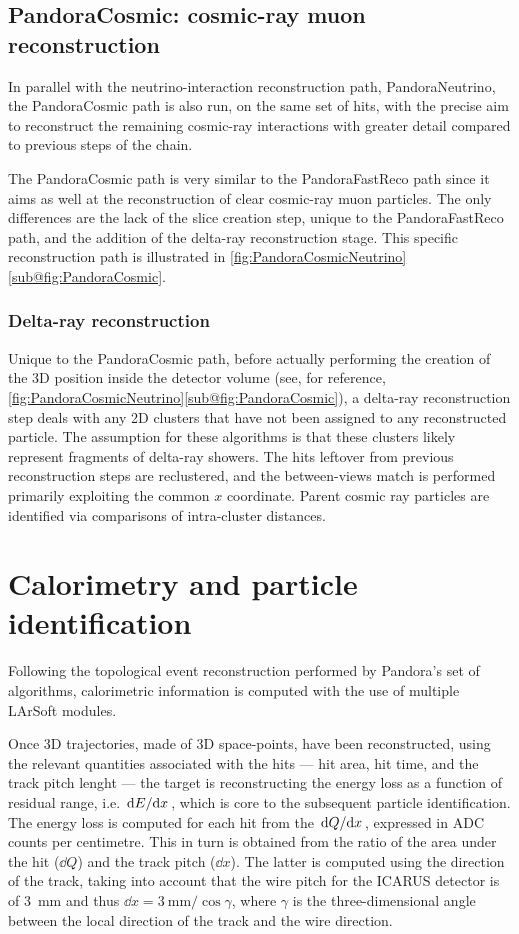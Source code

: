 \subsection{PandoraCosmic: cosmic-ray muon reconstruction}

In parallel with the neutrino-interaction reconstruction path, PandoraNeutrino, the PandoraCosmic path is also run, on the same set of hits, with the precise aim to reconstruct the remaining cosmic-ray interactions with greater detail compared to previous steps of the chain. 

The PandoraCosmic path is very similar to the PandoraFastReco path since it aims as well at the reconstruction of clear cosmic-ray muon particles. The only differences are the lack of the slice creation step, unique to the PandoraFastReco path, and the addition of the delta-ray reconstruction stage. This specific reconstruction path is illustrated in \autoref{fig:PandoraCosmicNeutrino}\ref{sub@fig:PandoraCosmic}. 

\subsubsection{Delta-ray reconstruction}

Unique to the PandoraCosmic path, before actually performing the creation of the 3D position inside the detector volume (see, for reference, \autoref{fig:PandoraCosmicNeutrino}\ref{sub@fig:PandoraCosmic}), a delta-ray reconstruction step deals with any 2D clusters that have not been assigned to any reconstructed particle. The assumption for these algorithms is that these clusters likely represent fragments of delta-ray showers. The hits leftover from previous reconstruction steps are reclustered, and the between-views match is performed primarily exploiting the common $x$ coordinate. Parent cosmic ray particles are identified via comparisons of intra-cluster distances. 

\section{Calorimetry and particle identification} \label{sec:calorimetryAndCalibration}

Following the topological event reconstruction performed by Pandora's set of algorithms, calorimetric information is computed with the use of multiple LArSoft modules. 

Once 3D trajectories, made of 3D space-points, have been reconstructed, using the relevant quantities associated with the hits --- hit area, hit time, and the track pitch lenght --- the target is reconstructing the energy loss as a function of residual range, i.e. $\dv*{E}{x}$, which is core to the  subsequent particle identification. The energy loss is computed for each hit from the $\dv*{Q}{x}$, expressed in ADC counts per centimetre. This in turn is obtained from the ratio of the area under the hit ($\dd Q$) and the track pitch ($\dd x$).  The latter is computed using the direction of the track, taking into account that the wire pitch for the ICARUS detector is of \SI{3}{\mm} and thus $\dd x = \SI{3}{\mm}/\cos\gamma$, where $\gamma$ is the three-dimensional angle between the local direction of the track and the wire direction. 

